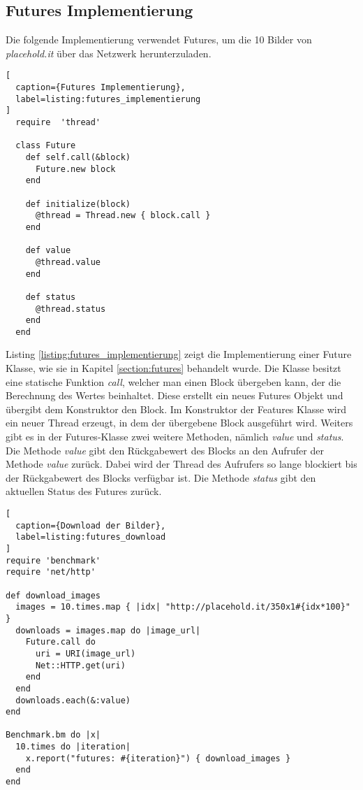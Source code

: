 \subsection{Futures Implementierung}

Die folgende Implementierung verwendet Futures, um die 10 Bilder von \emph{placehold.it} über das Netzwerk herunterzuladen.

\begin{lstlisting}[
  caption={Futures Implementierung},
  label=listing:futures_implementierung
]
  require  'thread'

  class Future
    def self.call(&block)
      Future.new block
    end

    def initialize(block)
      @thread = Thread.new { block.call }
    end

    def value
      @thread.value
    end

    def status
      @thread.status
    end
  end
\end{lstlisting}

Listing \ref{listing:futures_implementierung} zeigt die Implementierung einer Future Klasse, wie sie in Kapitel \ref{section:futures} behandelt wurde. Die Klasse besitzt eine statische Funktion \emph{call}, welcher man einen Block übergeben kann, der die Berechnung des Wertes beinhaltet. Diese erstellt ein neues Futures Objekt und übergibt dem Konstruktor den Block. Im Konstruktor der Features Klasse wird ein neuer Thread erzeugt, in dem der übergebene Block ausgeführt wird. Weiters gibt es in der Futures-Klasse zwei weitere Methoden, nämlich \emph{value} und \emph{status}. Die Methode \emph{value} gibt den Rückgabewert des Blocks an den Aufrufer der Methode \emph{value} zurück. Dabei wird der Thread des Aufrufers so lange blockiert bis der Rückgabewert des Blocks verfügbar ist. Die Methode \emph{status} gibt den aktuellen Status des Futures zurück.

\begin{lstlisting}[
  caption={Download der Bilder},
  label=listing:futures_download
]
require 'benchmark'
require 'net/http'

def download_images
  images = 10.times.map { |idx| "http://placehold.it/350x1#{idx*100}" }
  downloads = images.map do |image_url|
    Future.call do
      uri = URI(image_url)
      Net::HTTP.get(uri)
    end
  end
  downloads.each(&:value)
end

Benchmark.bm do |x|
  10.times do |iteration|
    x.report("futures: #{iteration}") { download_images }
  end
end
\end{lstlisting}

